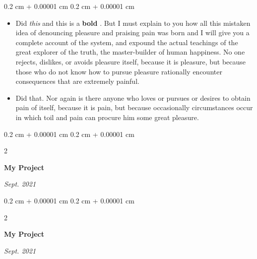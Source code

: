 \documentclass[10pt, letterpaper]{article}
\newenvironment{highlights}{
    \begin{itemize}[
        topsep=0.10 cm,
        parsep=0.10 cm,
        partopsep=0pt,
        itemsep=0pt,
        leftmargin=0.4 cm + 10pt
    ]
}{
    \end{itemize}
} %
\newenvironment{onecolentry}{
    \begin{adjustwidth}{
        0.2 cm + 0.00001 cm
    }{
        0.2 cm + 0.00001 cm
    }
}{
    \end{adjustwidth}
} %
\newenvironment{twocolentry}[2][]{
    \onecolentry
    \def\secondColumn{#2}
    \setcolumnwidth{\fill, 4.5 cm}
    \begin{paracol}{2}
}{
    \switchcolumn \raggedleft \secondColumn
    \end{paracol}
    \endonecolentry
} %
\let\hrefWithoutArrow\href
\renewcommand{\href}[2]{\hrefWithoutArrow{#1}{\mbox{\ifthenelse{\equal{#2}{}}{ }{#2 }\raisebox{.15ex}{\footnotesize \faExternalLink*}}}}
\begin{document}
        \vspace{0.10 cm-3px}
        \begin{onecolentry}
            \begin{highlights}
                \item Did \textit{this} and this is a \textbf{bold} \href{https://example.com}{link}. But I must explain to you how all this mistaken idea of denouncing pleasure and praising pain was born and I will give you a complete account of the system, and expound the actual teachings of the great explorer of the truth, the master-builder of human happiness. No one rejects, dislikes, or avoids pleasure itself, because it is pleasure, but because those who do not know how to pursue pleasure rationally encounter consequences that are extremely painful.
                \item Did that. Nor again is there anyone who loves or pursues or desires to obtain pain of itself, because it is pain, but because occasionally circumstances occur in which toil and pain can procure him some great pleasure.
            \end{highlights}
        \end{onecolentry}


        \vspace{0.2 cm-3px}

        \begin{twocolentry}{
            
            
        \textit{Sept. 2021}}
            \textbf{My Project}
        \end{twocolentry}



        \vspace{0.2 cm-3px}

        \begin{twocolentry}{
            
            
        \textit{Sept. 2021}}
            \textbf{My Project}
        \end{twocolentry}
\end{document}

